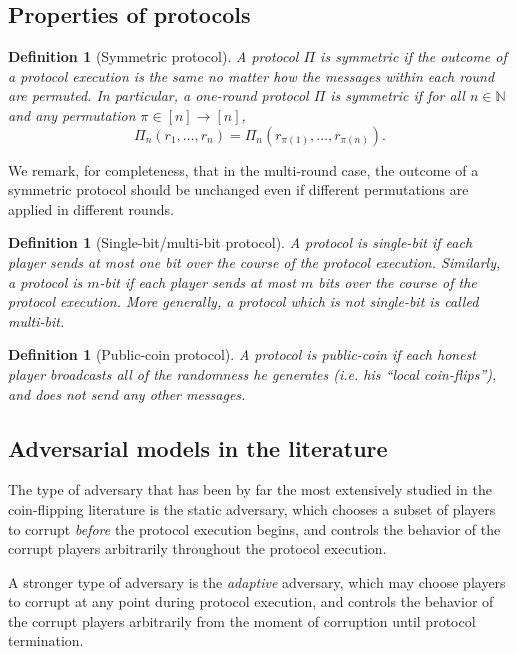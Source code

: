 \documentclass[11pt,letterpaper]{article}
\theoremstyle{plain}
\newtheorem{definition}[theorem]{Definition}
\theoremstyle{definition}
\newcommand{\NN}{\mathbb{N}}
\newcommand{\rarr}{\rightarrow}
\begin{document}
\subsection{Properties of protocols}


\begin{definition}[Symmetric protocol]
A protocol $\Pi$ is \emph{symmetric} if the outcome of a protocol execution is the same 
no matter how the messages within each round are permuted. In particular, a one-round protocol $\Pi$ is symmetric 
if for all $n\in\NN$ and any permutation $\pi\in[n]\rarr[n]$,
$$\Pi_n(r_{1},\dots,r_{n})=\Pi_n(r_{\pi(1)},\dots,r_{\pi(n)}).$$
\end{definition}

We remark, for completeness, that in the multi-round case,
the outcome of a symmetric protocol should be unchanged even if different permutations are applied in different rounds.

\begin{definition}[Single-bit/multi-bit protocol]
A protocol is \emph{single-bit} if each player sends at most one bit over the course of the protocol execution.
Similarly, a protocol is \emph{$m$-bit} if each player sends at most $m$ bits over the course of the protocol execution.
More generally, a protocol which is not single-bit is called \emph{multi-bit}.
\end{definition}

\begin{definition}[Public-coin protocol]
A protocol is \emph{public-coin} if each honest player broadcasts all of the randomness he generates 
(i.e. his ``local coin-flips''), and does not send any other messages.
\end{definition}



\subsection{Adversarial models in the literature}\label{sec:advModels}

The type of adversary that has been by far the most extensively studied in the coin-flipping literature
is the static adversary, which chooses a subset of players to corrupt \emph{before} the protocol execution begins,
and controls the behavior of the corrupt players arbitrarily throughout the protocol execution.

A stronger type of adversary is the \emph{adaptive} adversary, which may choose players to corrupt at any point during protocol execution,
and controls the behavior of the corrupt players arbitrarily from the moment of corruption until protocol termination.
\end{document}
